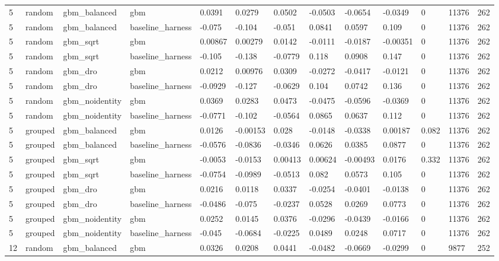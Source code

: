 \begin{tabular}{lllllllllllll}
5 & random & gbm\_balanced & gbm & 0.0391 & 0.0279 & 0.0502 & -0.0503 & -0.0654 & -0.0349 & 0 & 11376 & 262 \\
5 & random & gbm\_balanced & baseline\_harness & -0.075 & -0.104 & -0.051 & 0.0841 & 0.0597 & 0.109 & 0 & 11376 & 262 \\
5 & random & gbm\_sqrt & gbm & 0.00867 & 0.00279 & 0.0142 & -0.0111 & -0.0187 & -0.00351 & 0 & 11376 & 262 \\
5 & random & gbm\_sqrt & baseline\_harness & -0.105 & -0.138 & -0.0779 & 0.118 & 0.0908 & 0.147 & 0 & 11376 & 262 \\
5 & random & gbm\_dro & gbm & 0.0212 & 0.00976 & 0.0309 & -0.0272 & -0.0417 & -0.0121 & 0 & 11376 & 262 \\
5 & random & gbm\_dro & baseline\_harness & -0.0929 & -0.127 & -0.0629 & 0.104 & 0.0742 & 0.136 & 0 & 11376 & 262 \\
5 & random & gbm\_noidentity & gbm & 0.0369 & 0.0283 & 0.0473 & -0.0475 & -0.0596 & -0.0369 & 0 & 11376 & 262 \\
5 & random & gbm\_noidentity & baseline\_harness & -0.0771 & -0.102 & -0.0564 & 0.0865 & 0.0637 & 0.112 & 0 & 11376 & 262 \\
5 & grouped & gbm\_balanced & gbm & 0.0126 & -0.00153 & 0.028 & -0.0148 & -0.0338 & 0.00187 & 0.082 & 11376 & 262 \\
5 & grouped & gbm\_balanced & baseline\_harness & -0.0576 & -0.0836 & -0.0346 & 0.0626 & 0.0385 & 0.0877 & 0 & 11376 & 262 \\
5 & grouped & gbm\_sqrt & gbm & -0.0053 & -0.0153 & 0.00413 & 0.00624 & -0.00493 & 0.0176 & 0.332 & 11376 & 262 \\
5 & grouped & gbm\_sqrt & baseline\_harness & -0.0754 & -0.0989 & -0.0513 & 0.082 & 0.0573 & 0.105 & 0 & 11376 & 262 \\
5 & grouped & gbm\_dro & gbm & 0.0216 & 0.0118 & 0.0337 & -0.0254 & -0.0401 & -0.0138 & 0 & 11376 & 262 \\
5 & grouped & gbm\_dro & baseline\_harness & -0.0486 & -0.075 & -0.0237 & 0.0528 & 0.0269 & 0.0773 & 0 & 11376 & 262 \\
5 & grouped & gbm\_noidentity & gbm & 0.0252 & 0.0145 & 0.0376 & -0.0296 & -0.0439 & -0.0166 & 0 & 11376 & 262 \\
5 & grouped & gbm\_noidentity & baseline\_harness & -0.045 & -0.0684 & -0.0225 & 0.0489 & 0.0248 & 0.0717 & 0 & 11376 & 262 \\
12 & random & gbm\_balanced & gbm & 0.0326 & 0.0208 & 0.0441 & -0.0482 & -0.0669 & -0.0299 & 0 & 9877 & 252 \\

\end{tabular}
